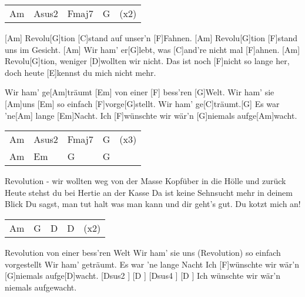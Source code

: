 

\begin{guitar}
 	{\footnotesize\begin{tabular}{l|l|l|l|l}
 		Am & Asus2 & Fmaj7 & G & (x2)
 	\end{tabular}}
	
	[Am] Revolu[G]tion [C]stand auf unser'n [F]Fahnen.
	[Am] Revolu[G]tion [F]stand uns im Gesicht.
	[Am] Wir ham' er[G]lebt, was [C]and're nicht mal [F]ahnen.
	[Am] Revolu[G]tion, weniger [D]wollten wir nicht.
	Das ist noch [F]nicht so lange her, doch heute [E]kennst du mich nicht mehr.
	
	Wir ham' ge[Am]träumt [Em] von einer [F] bess'ren [G]Welt.
	Wir ham' sie [Am]uns [Em] so einfach [F]vorge[G]stellt.
	Wir ham' ge[C]träumt.[G] Es war 'ne[Am] lange [Em]Nacht.
	Ich [F]wünschte wir wär'n [G]niemals aufge[Am]wacht.
	
	{\footnotesize\begin{tabular}{l|l|l|l|l}
		Am & Asus2 & Fmaj7 & G & (x3) \\
		Am & Em & G & G & 
	\end{tabular}}

	Revolution - wir wollten weg von der Masse
	Kopfüber in die Hölle und zurück
	Heute stehst du bei Hertie an der Kasse
	Da ist keine Sehnsucht mehr in deinem Blick
	Du sagst, man tut halt was man kann und dir geht's gut. Du kotzt mich an!
	
	 
		
	{\footnotesize\begin{tabular}{l|l|l|l|l}
		Am	& G	& D	& D	& (x2)
	\end{tabular}}
	
	\pagebreak
	
	Revolution von einer bess'ren Welt
	Wir ham' sie uns (Revolution) so einfach vorgestellt
	Wir ham' geträumt. Es war 'ne lange Nacht
	Ich	[F]wünschte wir wär'n [G]niemals aufge[D]wacht. [Dsus2 ] [D ] [Dsus4 ] [D ]{} 
	Ich wünschte wir wär'n niemals aufgewacht.
	
\end{guitar}